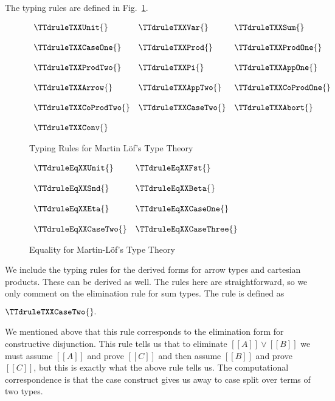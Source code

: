 The typing rules are defined in Fig.~\ref{fig:lof_typing}.
\begin{figure}
  \begin{center}
    \begin{math}
      \begin{array}{lll}
        \TTdruleTXXUnit{} & \TTdruleTXXVar{} & \TTdruleTXXSum{}\\
        & \\
        \TTdruleTXXCaseOne{} & \TTdruleTXXProd{} & \TTdruleTXXProdOne{}\\
        & \\
        \TTdruleTXXProdTwo{} & \TTdruleTXXPi{} & \TTdruleTXXAppOne{}\\
        & \\
        \TTdruleTXXArrow{} & \TTdruleTXXAppTwo{} & \TTdruleTXXCoProdOne{}\\ 
        & \\
        \TTdruleTXXCoProdTwo{} & \TTdruleTXXCaseTwo{} & \TTdruleTXXAbort{}\\
        & \\
        \TTdruleTXXConv{}
      \end{array}
    \end{math}
  \end{center}
  \caption{Typing Rules for Martin L\"of's Type Theory}
  \label{fig:lof_typing}
\end{figure}
\begin{figure}
  \begin{center}
    \begin{math}
      \begin{array}{lll}
        \TTdruleEqXXUnit{} & \TTdruleEqXXFst{}\\
        &\\
        \TTdruleEqXXSnd{} & \TTdruleEqXXBeta{}\\
        &\\
        \TTdruleEqXXEta{} & \TTdruleEqXXCaseOne{}\\
        &\\
        \TTdruleEqXXCaseTwo{} & \TTdruleEqXXCaseThree{}
      \end{array}
    \end{math}
  \end{center}
  \caption{Equality for Martin-L\"of's Type Theory}
  \label{fig:lof_eq}
\end{figure}
We include the typing rules for the derived forms for arrow types
and cartesian products.  These can be derived as well.  The rules here
are straightforward, so we only comment on the elimination rule for sum
types.  The rule is defined as
\begin{center}
  \begin{math}
    \TTdruleTXXCaseTwo{}.
  \end{math}
\end{center}
We mentioned above that this rule corresponds to the elimination form
for constructive disjunction.  This rule tells us that to eliminate
$[[A]] \lor [[B]]$ we must assume $[[A]]$ and prove $[[C]]$ and then
assume $[[B]]$ and prove $[[C]]$, but this is exactly what the above
rule tells us.  The computational correspondence is that the case
construct gives us away to case split over terms of two types.

